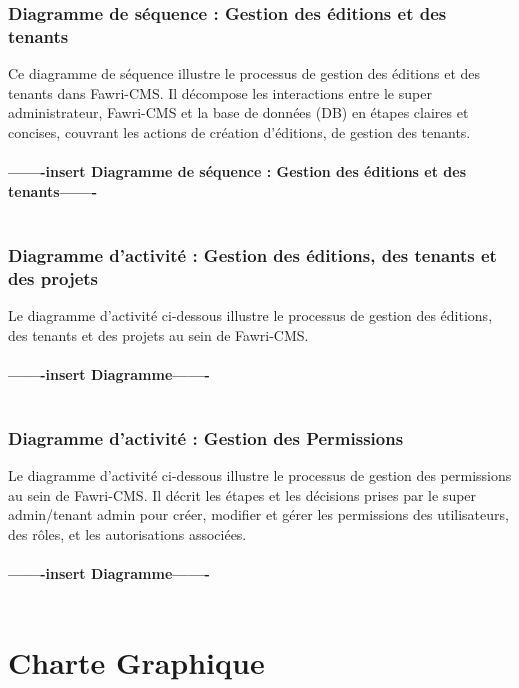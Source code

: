 \subsubsection{Diagramme de séquence : Gestion des éditions et des tenants}

\hspace{\parindent}Ce diagramme de séquence illustre le processus de gestion des éditions et des tenants dans Fawri-CMS. Il décompose les interactions entre le super administrateur, Fawri-CMS et la base de données (DB) en étapes claires et concises, couvrant les actions de création d'éditions, de gestion des tenants.
\\
\\
\textbf{-------insert Diagramme de séquence : Gestion des éditions et des tenants-------}
\\
\\


\subsubsection{Diagramme d'activité : Gestion des éditions, des tenants et des projets}
\hspace{\parindent}Le diagramme d'activité ci-dessous illustre le processus de gestion des éditions, des tenants et des projets au sein de Fawri-CMS.
\\
\\
\textbf{-------insert Diagramme-------}
\\
\\




\subsubsection{Diagramme d'activité : Gestion des Permissions}
\hspace{\parindent}Le diagramme d'activité ci-dessous illustre le processus de gestion des permissions au sein de Fawri-CMS. Il décrit les étapes et les décisions prises par le super admin/tenant admin pour créer, modifier et gérer les permissions des utilisateurs, des rôles, et les autorisations associées.
\\
\\
\textbf{-------insert Diagramme-------}
\\
\\






\section{Charte Graphique}

